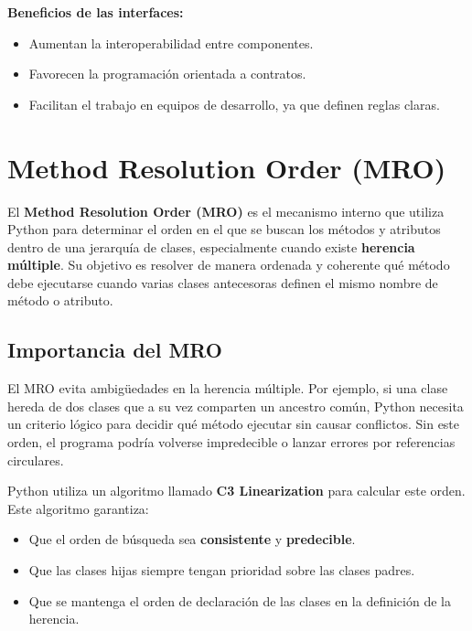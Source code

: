 \documentclass[12pt,a4paper]{article}
\begin{document}
\textbf{Beneficios de las interfaces:}
\begin{itemize}
    \item Aumentan la interoperabilidad entre componentes.
    \item Favorecen la programación orientada a contratos.
    \item Facilitan el trabajo en equipos de desarrollo, ya que definen reglas claras.
\end{itemize}

\FloatBarrier

\section{Method Resolution Order (MRO)}

El \textbf{Method Resolution Order (MRO)} es el mecanismo interno que utiliza Python para determinar el orden en el que se buscan los métodos y atributos dentro de una jerarquía de clases, especialmente cuando existe \textbf{herencia múltiple}.  
Su objetivo es resolver de manera ordenada y coherente qué método debe ejecutarse cuando varias clases antecesoras definen el mismo nombre de método o atributo.

\subsection*{Importancia del MRO}
El MRO evita ambigüedades en la herencia múltiple. Por ejemplo, si una clase hereda de dos clases que a su vez comparten un ancestro común, Python necesita un criterio lógico para decidir qué método ejecutar sin causar conflictos.  
Sin este orden, el programa podría volverse impredecible o lanzar errores por referencias circulares.

Python utiliza un algoritmo llamado \textbf{C3 Linearization} para calcular este orden.  
Este algoritmo garantiza:
\begin{itemize}
    \item Que el orden de búsqueda sea \textbf{consistente} y \textbf{predecible}.
    \item Que las clases hijas siempre tengan prioridad sobre las clases padres.
    \item Que se mantenga el orden de declaración de las clases en la definición de la herencia.
\end{itemize}
\end{document}
